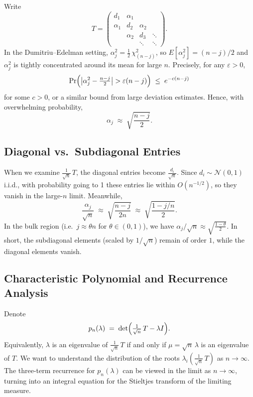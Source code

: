 \documentclass[letterpaper,11pt,oneside,reqno]{article}
\numberwithin{equation}{section}
\theoremstyle{definition}
\begin{document}
Write
\[
  T = \begin{pmatrix}
    d_1 & \alpha_1 & & \\
    \alpha_1 & d_2 & \alpha_2 & \\
    & \alpha_2 & d_3 & \ddots \\
    & & \ddots & \ddots
  \end{pmatrix}.
\]
In the Dumitriu--Edelman setting, $\alpha_j^2 = \frac{1}{2}\,\chi^2_{(n-j)}$, so $ E[\alpha_j^2]=(n-j)/2$ and $\alpha_j^2$ is tightly concentrated around its mean for large $n$. Precisely, for any $\varepsilon>0$,
\[
  \Pr\Bigl(\bigl|\alpha_j^2 - \tfrac{n-j}{2}\bigr| > \varepsilon (n-j)\Bigr)
  \;\le\; e^{-c(n-j)}
\]
for some $c>0$, or a similar bound from large deviation estimates. Hence, with overwhelming probability,
\[
  \alpha_j \;\approx\; \sqrt{\frac{n-j}{2}}.
\]

\subsection{Diagonal vs.\ Subdiagonal Entries}

When we examine $\frac{1}{\sqrt{n}}\,T$, the diagonal entries become $\frac{d_i}{\sqrt{n}}$. Since $d_i \sim \mathcal{N}(0,1)$ i.i.d., with probability going to 1 these entries lie within $O(n^{-1/2})$, so they vanish in the large-$n$ limit. Meanwhile,
\[
  \frac{\alpha_j}{\sqrt{n}}
  \;\approx\;
  \sqrt{\frac{n-j}{2n}}
  \;\approx\;
  \sqrt{\frac{1 - j/n}{2}}.
\]
In the bulk region (i.e.\ $j\approx \theta n$ for $\theta\in (0,1)$), we have $\alpha_j/\sqrt{n} \approx \sqrt{\frac{1-\theta}{2}}$. In short, the subdiagonal elements (scaled by $1/\sqrt{n}$) remain of order $1$, while the diagonal elements vanish.

\subsection{Characteristic Polynomial and Recurrence Analysis}

Denote
\[
  p_n(\lambda) \;=\;
  \det\Bigl(\tfrac1{\sqrt{n}}\,T - \lambda I\Bigr).
\]
Equivalently, $\lambda$ is an eigenvalue of $\frac{1}{\sqrt{n}}\,T$ if and only if $\mu = \sqrt{n}\,\lambda$ is an eigenvalue of $T$. We want to understand the distribution of the roots $\lambda_i(\frac{1}{\sqrt{n}}\,T)$ as $n\to\infty$. The three-term recurrence for $p_n(\lambda)$ can be viewed in the limit as $n\to\infty$, turning into an integral equation for the Stieltjes transform of the limiting measure.
\end{document}
